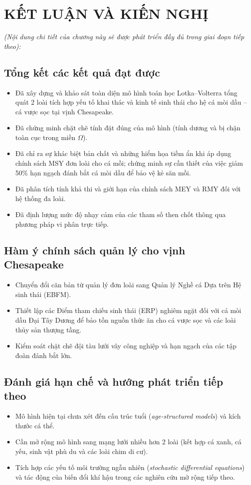 \chapter{KẾT LUẬN VÀ KIẾN NGHỊ}
\label{ch:conclusion}

\textit{(Nội dung chi tiết của chương này sẽ được phát triển đầy đủ trong giai đoạn tiếp theo):}

\section{Tổng kết các kết quả đạt được}
\begin{itemize}
    \item Đã xây dựng và khảo sát toàn diện mô hình toán học Lotka--Volterra tổng quát 2 loài tích hợp yếu tố khai thác và kinh tế sinh thái cho hệ cá mòi dầu -- cá vược sọc tại vịnh Chesapeake.
    \item Đã chứng minh chặt chẽ tính đặt đúng của mô hình (tính dương và bị chặn toàn cục trong miền $\Omega$).
    \item Đã chỉ ra sự khác biệt bản chất và những hiểm họa tiềm ẩn khi áp dụng chính sách MSY đơn loài cho cá mồi; chứng minh sự cần thiết của việc giảm 50\% hạn ngạch đánh bắt cá mòi dầu để bảo vệ kẻ săn mồi.
    \item Đã phân tích tính khả thi và giới hạn của chính sách MEY và RMY đối với hệ thống đa loài.
    \item Đã định lượng mức độ nhạy cảm của các tham số then chốt thông qua phương pháp vi phân trực tiếp.
\end{itemize}

\section{Hàm ý chính sách quản lý cho vịnh Chesapeake}
\begin{itemize}
    \item Chuyển đổi căn bản từ quản lý đơn loài sang Quản lý Nghề cá Dựa trên Hệ sinh thái (EBFM).
    \item Thiết lập các Điểm tham chiếu sinh thái (ERP) nghiêm ngặt đối với cá mòi dầu Đại Tây Dương để bảo tồn nguồn thức ăn cho cá vược sọc và các loài thủy sản thượng tầng.
    \item Kiểm soát chặt chẽ đội tàu lưới vây công nghiệp và hạn ngạch của các tập đoàn đánh bắt lớn.
\end{itemize}

\section{Đánh giá hạn chế và hướng phát triển tiếp theo}
\begin{itemize}
    \item Mô hình hiện tại chưa xét đến cấu trúc tuổi (\textit{age-structured models}) và kích thước cá thể.
    \item Cần mở rộng mô hình sang mạng lưới nhiều hơn 2 loài (kết hợp cá xanh, cá yếu, sinh vật phù du và các loài chim di cư).
    \item Tích hợp các yếu tố môi trường ngẫu nhiên (\textit{stochastic differential equations}) và tác động của biến đổi khí hậu trong các nghiên cứu mở rộng tiếp theo.
\end{itemize}
